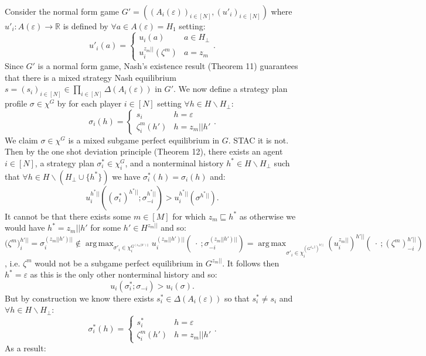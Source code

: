 \documentclass[11pt]{article}
\DeclareMathOperator*{\argmax}{arg\,max}
\theoremstyle{definition}
\theoremstyle{plain}
\begin{document}
\\
Consider the normal form game $G'=((A_i(\varepsilon))_{i \in [N]},(u'_i)_{i \in [N]})$ where $u'_i: A({\varepsilon}) \to \mathbb{R}$ is defined by $\forall a \in A({\varepsilon})=H_1$ setting: 
$$u'_i(a)=\begin{cases}u_i(a) & a \in H_{\bot} \\ u^{z_m||}_i(\zeta^m) & a=z_m \end{cases}.$$
Since $G'$ is a normal form game, Nash's existence result (Theorem 11) guarantees that there is a mixed strategy Nash equilibrium $s=(s_i)_{i \in [N]} \in \prod_{i \in [N]} \Delta(A_i(\varepsilon))$ in $G'$. We now define a strategy plan profile $\sigma \in \chi^G$ by for each player $i \in [N]$ setting $\forall h \in H \backslash H_{\bot}$:
$$\sigma_i(h)=\begin{cases}s_i & h=\varepsilon \\
\zeta^m_i(h')&  h=z_m||h' \end{cases}.$$
We claim $\sigma \in \chi^G$ is a mixed subgame perfect equilibrium in $G$. STAC it is not. Then by the one shot deviation principle (Theorem 12), there exists an agent $i \in [N]$, a strategy plan $\sigma^*_i \in \chi^G_i$, and a nonterminal history $h^* \in H \backslash H_{\bot}$ such that $\forall h \in H \backslash (H_\bot \cup \{h^*\})$ we have $\sigma^*_i(h)=\sigma_i(h)$ and:
$$u_i^{h^*||}((\sigma^*_i)^{h^*||};  \sigma_{-i}^{h^*||})>u_i^{h^*||}(\sigma^{h^*||}).$$
It cannot be that there exists some $m \in [M]$ for which $z_m \sqsubseteq h^*$ as otherwise we would have $h^*=z_m||h'$ for some $h' \in H^{z_m||}$ and so:
$${(\zeta^{m}})^{h'||}_i=\sigma_i^{(z_m||h')||} \notin \argmax_{\sigma'_i \in \chi_i^{G^{(z_m||h')||}}} u^{(z_m||h')||}_i(\ \cdot \ ; \sigma_{-i}^{(z_m||h')||}) =\argmax_{\sigma'_i \in \chi_i^{(G^{z_m||})^{h'||}}} ({u_i^{z_m||}})^{h'||}(\ \cdot \ ; (\zeta^m)^{h'||}_{-i}) $$
, i.e. $\zeta^m$ would not be a subgame perfect equilibrium in $G^{z_m||}$. It follows then $h^*=\varepsilon$ as this is the only other nonterminal history and so:
$$u_i(\sigma^*_i;\sigma_{-i})>u_i(\sigma).$$
But by construction we know there exists $s^*_i \in \Delta(A_i(\varepsilon))$ so that $s^*_i \neq s_i$ and  $\forall h \in H \backslash H_{\bot}$:
$$\sigma^*_i(h)=\begin{cases}s^*_i & h=\varepsilon \\ \zeta^m_i(h') & h= z_m||h' \end{cases}.$$
As a result:
\end{document}
